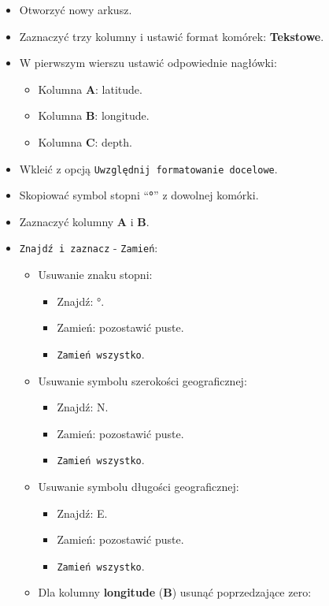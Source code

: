 \documentclass[
  letterpaper,
  DIV=11,
  numbers=noendperiod]{scrreprt}
\providecommand{\tightlist}{%
  \setlength{\itemsep}{0pt}\setlength{\parskip}{0pt}}\usepackage{longtable,booktabs,array}
\begin{document}
\begin{itemize}
\item
  Otworzyć nowy arkusz.
\item
  Zaznaczyć trzy kolumny i ustawić format komórek: \textbf{Tekstowe}.
\item
  W pierwszym wierszu ustawić odpowiednie nagłówki:

  \begin{itemize}
  \tightlist
  \item
    Kolumna \textbf{A}: latitude.
  \item
    Kolumna \textbf{B}: longitude.
  \item
    Kolumna \textbf{C}: depth.
  \end{itemize}
\item
  Wkleić z opcją \texttt{Uwzględnij\ formatowanie\ docelowe}.
\item
  Skopiować symbol stopni ``\textbf{°}'' z dowolnej komórki.
\item
  Zaznaczyć kolumny \textbf{A} i \textbf{B}.
\item
  \texttt{Znajdź\ i\ zaznacz} - \texttt{Zamień}:

  \begin{itemize}
  \tightlist
  \item
    Usuwanie znaku stopni:

    \begin{itemize}
    \tightlist
    \item
      Znajdź: °.
    \item
      Zamień: pozostawić puste.
    \item
      \texttt{Zamień\ wszystko}.
    \end{itemize}
  \item
    Usuwanie symbolu szerokości geograficznej:

    \begin{itemize}
    \tightlist
    \item
      Znajdź: N.
    \item
      Zamień: pozostawić puste.
    \item
      \texttt{Zamień\ wszystko}.
    \end{itemize}
  \item
    Usuwanie symbolu długości geograficznej:

    \begin{itemize}
    \tightlist
    \item
      Znajdź: E.
    \item
      Zamień: pozostawić puste.
    \item
      \texttt{Zamień\ wszystko}.
    \end{itemize}
  \item
    Dla kolumny \textbf{longitude} (\textbf{B}) usunąć poprzedzające
    zero:


\end{itemize}
\end{itemize}
\end{document}
